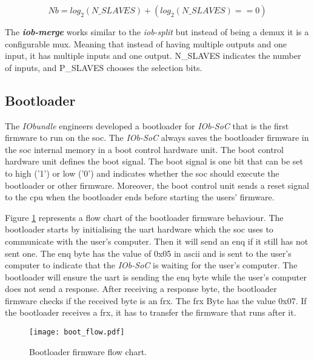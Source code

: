 \begin{equation}
    \label{eq:number_bits}
    Nb = log_2(N\_SLAVES)+(log_2(N\_SLAVES)==0)
\end{equation}

The \textbf{\textit{iob-merge}} works similar to the \textit{iob-split} but instead of being a \acrshort{demux} it is a configurable \acrfull{mux}. Meaning that instead of having multiple outputs and one input, it has multiple inputs and one output. N\_SLAVES indicates the number of inputs, and P\_SLAVES chooses the selection bits.

\subsection{Bootloader}
The \textit{IObundle} engineers developed a bootloader for \textit{IOb-SoC} that is the first firmware to run on the \acrlong{soc}. The \textit{IOb-SoC} always saves the bootloader firmware in the \acrshort{soc} internal memory in a boot control hardware unit. The boot control hardware unit defines the boot signal. The boot signal is one bit that can be set to high ('1') or low ('0') and indicates whether the \acrshort{soc} should execute the bootloader or other firmware. Moreover, the boot control unit sends a reset signal to the \acrshort{cpu} when the bootloader ends before starting the users' firmware.

Figure \ref{fig:boot_flow} represents a flow chart of the bootloader firmware behaviour. The bootloader starts by initialising the \acrshort{uart} hardware which the \acrshort{soc} uses to communicate with the user's computer. Then it will send an \acrfull{enq} if it still has not sent one. The \acrshort{enq} byte has the value of 0x05 in \acrshort{ascii} and is sent to the user's computer to indicate that the \textit{IOb-SoC} is waiting for the user's computer. The bootloader will ensure the \acrshort{uart} is sending the \acrshort{enq} byte while the user's computer does not send a response. After receiving a response byte, the bootloader firmware checks if the received byte is an \acrfull{frx}. The \acrshort{frx} Byte has the value 0x07. If the bootloader receives a \acrshort{frx}, it has to transfer the firmware that runs after it.

\begin{figure}[!h]
    \centering
    \texttt{[image: boot\_flow.pdf]}
    \caption{Bootloader firmware flow chart.}
    \label{fig:boot_flow}
\end{figure}

